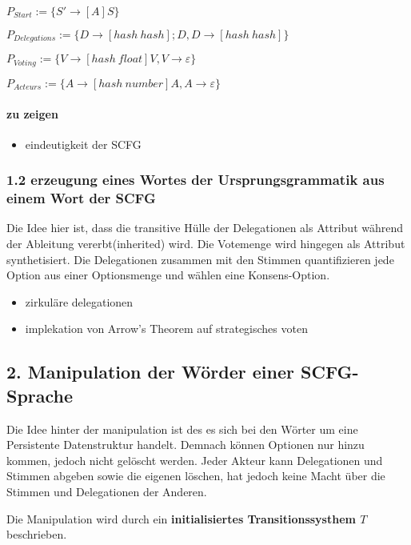 \documentclass[]{article}
\begin{document}
$P_{Start} := \{S'\rightarrow [A]S\}$

$P_{Delegations} := \{D\rightarrow [hash\ hash];D,D\rightarrow [hash\ hash]\}$

$P_{Voting} := \{V\rightarrow [hash\ float]V, V \rightarrow \varepsilon\}$

$P_{Acteurs} := \{A\rightarrow[hash\ number]A,A\rightarrow \varepsilon\}$

\paragraph{zu zeigen}

\begin{itemize}
\itemsep1pt\parskip0pt
\item
  eindeutigkeit der SCFG
\end{itemize}

\subsubsection{1.2 erzeugung eines Wortes der Ursprungsgrammatik aus
einem Wort der SCFG}

Die Idee hier ist, dass die transitive Hülle der Delegationen als
Attribut während der Ableitung vererbt(inherited) wird. Die Votemenge
wird hingegen als Attribut synthetisiert. Die Delegationen zusammen mit
den Stimmen quantifizieren jede Option aus einer Optionsmenge und wählen
eine Konsens-Option.


\begin{itemize}
\itemsep1pt\parskip0pt
\item
  zirkuläre delegationen
\item
  implekation von Arrow's Theorem auf strategisches voten
\end{itemize}

\subsection{2. Manipulation der Wörder einer SCFG-Sprache}

Die Idee hinter der manipulation ist des es sich bei den Wörter um eine Persistente Datenstruktur handelt. Demnach können Optionen nur hinzu kommen, jedoch nicht gelöscht werden. Jeder Akteur kann Delegationen und Stimmen abgeben sowie
die eigenen löschen, hat jedoch keine Macht über die Stimmen und
Delegationen der Anderen.

Die Manipulation wird durch ein \textbf{initialisiertes Transitionssysthem $T$}
beschrieben.
\end{document}
